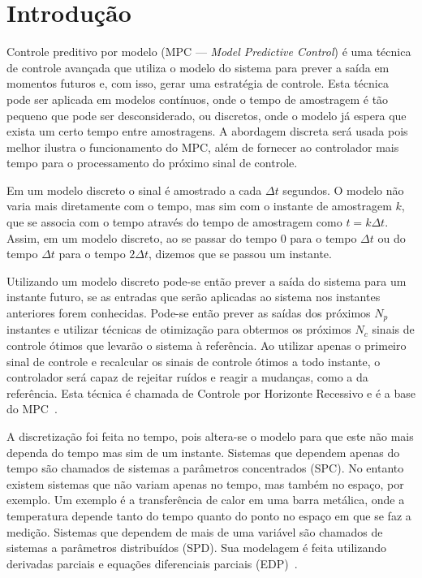 
\chapter{Introdução}%
\label{chp:introducao}

Controle preditivo por modelo (\ac{MPC} --- \textit{Model Predictive Control}) é
uma técnica de controle avançada que utiliza o modelo do sistema para prever a
saída em momentos futuros e, com isso, gerar uma estratégia de controle. Esta
técnica pode ser aplicada em modelos contínuos, onde o tempo de amostragem é tão
pequeno que pode ser desconsiderado, ou discretos, onde o modelo já espera que
exista um certo tempo entre amostragens. A abordagem discreta será usada pois
melhor ilustra o funcionamento do \ac{MPC}, além de fornecer ao controlador mais
tempo para o processamento do próximo sinal de controle.

Em um modelo discreto o sinal é amostrado a cada \( \Delta{}t \) segundos. O
modelo não varia mais diretamente com o tempo, mas sim com o instante de
amostragem \( k \), que se associa com o tempo através do tempo de amostragem
como \( t = k\Delta{}t \). Assim, em um modelo discreto, ao se passar do tempo
\( 0 \) para o tempo \( \Delta{}t \) ou do tempo \( \Delta{}t \) para o tempo
\( 2\Delta{}t \), dizemos que se passou um instante.

Utilizando um modelo discreto pode-se então prever a saída do sistema para um
instante futuro, se as entradas que serão aplicadas ao sistema nos instantes
anteriores forem conhecidas. Pode-se então prever as saídas dos próximos \(N_p\)
instantes e utilizar técnicas de otimização para obtermos os próximos \(N_c\)
sinais de controle ótimos que levarão o sistema à referência. Ao utilizar apenas
o primeiro sinal de controle e recalcular os sinais de controle ótimos a todo
instante, o controlador será capaz de rejeitar ruídos e reagir a mudanças, como
a da referência. Esta técnica é chamada de Controle por Horizonte Recessivo e é
a base do \ac{MPC}~\cite{book:wang}.

A discretização foi feita no tempo, pois altera-se o modelo para que este não
mais dependa do tempo mas sim de um instante. Sistemas que dependem apenas do
tempo são chamados de sistemas a parâmetros concentrados (\ac{SPC}). No entanto
existem sistemas que não variam apenas no tempo, mas também no espaço, por
exemplo. Um exemplo é a transferência de calor em uma barra metálica, onde a
temperatura depende tanto do tempo quanto do ponto no espaço em que se faz a
medição. Sistemas que dependem de mais de uma variável são chamados de sistemas
a parâmetros distribuídos (\ac{SPD}). Sua modelagem é feita utilizando derivadas
parciais e equações diferenciais parciais (\ac{EDP})~\cite{masterthesis:nelson}.

